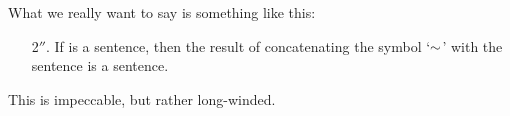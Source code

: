 What we really want to say is something like this:
	\begin{enumerate}
		\item[2$''$.] If \metaA{} is a sentence, then the result of concatenating the symbol `$\enot$' with the sentence \metaA{} is a sentence.
	\end{enumerate}
This is impeccable, but rather long-winded. %
